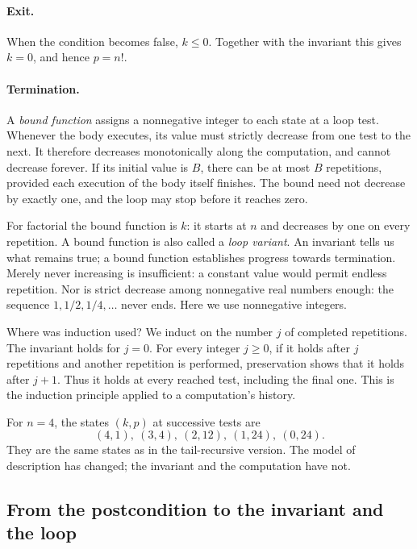 \paragraph{Exit.}
When the condition becomes false, $k\leq0$. Together with the invariant
this gives $k=0$, and hence $p=n!$.

\paragraph{Termination.}
A \emph{bound function} assigns a nonnegative integer to each state
at a loop test. Whenever the body executes, its value must strictly
decrease from one test to the next. It therefore decreases monotonically
along the computation, and cannot decrease forever. If its initial value
is $B$, there can be at most $B$ repetitions, provided each execution of
the body itself finishes. The bound need not decrease by exactly one,
and the loop may stop before it reaches zero.

For factorial the bound function is $k$: it starts at $n$ and decreases
by one on every repetition. A bound function is also called a
\emph{loop variant}. An invariant tells us what remains true; a bound
function establishes progress towards termination. Merely never increasing
is insufficient: a constant value would permit endless repetition.
Nor is strict decrease among nonnegative real numbers enough: the sequence
$1,1/2,1/4,\ldots$ never ends. Here we use nonnegative integers.

Where was induction used? We induct on the number $j$ of completed
repetitions. The invariant holds for $j=0$. For every integer $j\geq0$,
if it holds after $j$ repetitions and another repetition is performed,
preservation shows that it holds after $j+1$. Thus it holds at every
reached test, including the final one. This is the induction principle
applied to a computation's history.

For $n=4$, the states $(k,p)$ at successive tests are
\[
(4,1),\ (3,4),\ (2,12),\ (1,24),\ (0,24).
\]
They are the same states as in the tail-recursive version. The model of
description has changed; the invariant and the computation have not.

\subsection{From the postcondition to the invariant and the loop}

